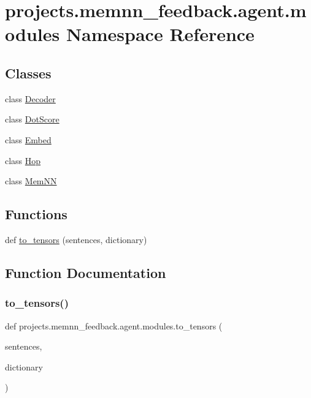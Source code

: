 \hypertarget{namespaceprojects_1_1memnn__feedback_1_1agent_1_1modules}{}\section{projects.\+memnn\+\_\+feedback.\+agent.\+modules Namespace Reference}
\label{namespaceprojects_1_1memnn__feedback_1_1agent_1_1modules}
\subsection*{Classes}
\begin{DoxyCompactItemize}
\item 
class \hyperlink{classprojects_1_1memnn__feedback_1_1agent_1_1modules_1_1Decoder}{Decoder}
\item 
class \hyperlink{classprojects_1_1memnn__feedback_1_1agent_1_1modules_1_1DotScore}{Dot\+Score}
\item 
class \hyperlink{classprojects_1_1memnn__feedback_1_1agent_1_1modules_1_1Embed}{Embed}
\item 
class \hyperlink{classprojects_1_1memnn__feedback_1_1agent_1_1modules_1_1Hop}{Hop}
\item 
class \hyperlink{classprojects_1_1memnn__feedback_1_1agent_1_1modules_1_1MemNN}{Mem\+NN}
\end{DoxyCompactItemize}
\subsection*{Functions}
\begin{DoxyCompactItemize}
\item 
def \hyperlink{namespaceprojects_1_1memnn__feedback_1_1agent_1_1modules_aa0f3493dccc8a3c07b66c48378f14003}{to\+\_\+tensors} (sentences, dictionary)
\end{DoxyCompactItemize}


\subsection{Function Documentation}
\mbox{\label{namespaceprojects_1_1memnn__feedback_1_1agent_1_1modules_aa0f3493dccc8a3c07b66c48378f14003}} 
\subsubsection{\texorpdfstring{to\+\_\+tensors()}{to\_tensors()}}
{\footnotesize\ttfamily def projects.\+memnn\+\_\+feedback.\+agent.\+modules.\+to\+\_\+tensors (\begin{DoxyParamCaption}\item[{}]{sentences,  }\item[{}]{dictionary }\end{DoxyParamCaption})}


